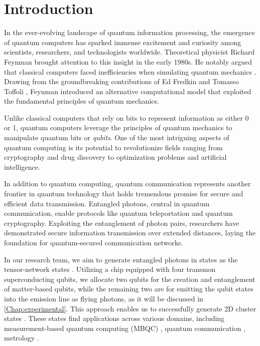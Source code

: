 \chapter*{Introduction}
\label{chap:intro}

\pagestyle{fancy}
\thispagestyle{fancy}

In the ever-evolving landscape of quantum information processing, the emergence of quantum computers has sparked immense excitement and curiosity among scientists, researchers, and technologists worldwide.
Theoretical physicist Richard Feynman brought attention to this insight in the early 1980s.
He notably argued that classical computers faced inefficiencies when simulating quantum mechanics \cite{Feynman}. 
Drawing from the groundbreaking contributions of Ed Fredkin and Tomasso Toffoli \cite{Ed_tommy}, Feynman introduced an alternative computational model that exploited the fundamental principles of quantum mechanics.

Unlike classical computers that rely on bits to represent information as either 0 or 1, quantum computers leverage the principles of quantum mechanics to manipulate quantum bits or \emph{qubits}.
One of the most intriguing aspects of quantum computing is its potential to revolutionize fields ranging from cryptography and drug discovery to optimization problems and artificial intelligence.

In addition to quantum computing, quantum communication \cite{Quantum_communication} represents another frontier in quantum technology that holds tremendous promise for secure and efficient data transmission.
Entangled photons, central in quantum communication, enable protocols like quantum teleportation \cite{Quantum_teleportation} and quantum cryptography. 
Exploiting the entanglement of photon pairs, researchers have demonstrated secure information transmission over extended distances, laying the foundation for quantum-secured communication networks.

In our research team, we aim to generate entangled photons in states as the tensor-network states \cite{tensor_networks}.
Utilizing a chip equipped with four transmon superconducting qubits, we allocate two qubits for the creation and entanglement of matter-based qubits, while the remaining two are for emitting the qubit states into the emission line as flying photons, as it will be discussed in \cref{Chap:experimental}. 
This approach enables us to successfully generate 2D cluster states \cite{HernandezAnton2023}.
These states find applications across various domains, including measurement-based quantum computing (MBQC) \cite{MBQC, MBQC_3}, quantum communication \cite{Quantum_communication}, metrology \cite{metrology}.

